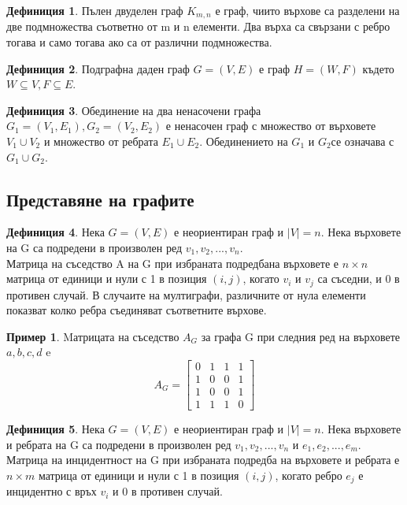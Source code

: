 \documentclass[fleqn, 12pt]{article}
\theoremstyle{definition}
\newtheorem{example}{Пример}[subsection]
\newtheorem{definition}{Дефиниция}[subsection]
\begin{document}
\begin{definition}
Пълен двуделен граф $K_{m,n}$ е граф, чиито върхове са разделени на две подмножества съответно от m и n елементи. Два върха са свързани с ребро тогава и само тогава ако са от различни подмножества.
\end{definition}
\begin{definition}
Подграфна даден граф $G = (V, E)$ е граф $H = (W, F)$ където $W \subseteq V, F \subseteq E$.
\end{definition}
\begin{definition}
Обединение на два ненасочени графа $G_1= (V_1, E_1), G_2= (V_2, E_2)$ е ненасочен граф с множество от върховете $V_1\cup V_2 $ и множество от ребрата $E_1 \cup E_2$. Обединението на $G_1$ и $G_2$се означава с $G_1\cup G_2$.
\end{definition}
\subsection{Представяне на графите}
\begin{definition}
Нека $G = (V, E)$ е неориентиран граф и $\vert V \vert = n$. Нека върховете на G са подредени в произволен ред $v_1, v_2, ..., v_n$. \\
Матрица на съседство A  на G при избраната подредбана върховете е $n \times n$ матрица от единици и нули с 1 в позиция $(i, j)$, когато $v_i$ и $v_j$ са съседни, и 0 в противен случай. В случаите на мултиграфи, различните от нула елементи показват колко ребра съединяват съответните върхове.
\end{definition}
\begin{example}
Mатрицата на съседство $A_G$ за графа G при следния ред на върховете $a, b, c, d$ e \\
$$A_G = 
\left[
\begin{matrix}
0 & 1 & 1 & 1\\
1 & 0 & 0 & 1\\
1 & 0 & 0 & 1 \\
1 & 1 & 1 & 0
\end{matrix}
\right]$$
\end{example}

\begin{definition}
Нека $G = (V, E)$ е неориентиран граф и $\vert V \vert = n$. Нека върховете и ребрата на G са подредени в произволен ред $v_1, v_2, ..., v_n$ и $e_1,e_2, ..., e_m$. \\
Матрица на инцидентност на G при избраната подредба на върховете и ребрата е $n \times m$ матрица от единици и нули с 1 в позиция $(i, j)$, когато ребро $e_j$ е инцидентно с връх $v_i$ и 0 в противен случай.
\end{definition}
\end{document}
